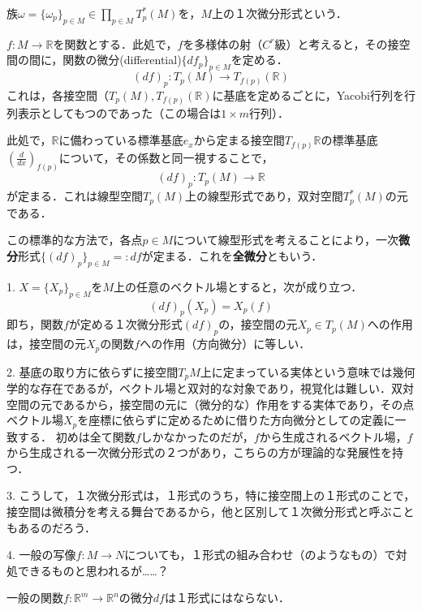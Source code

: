 \documentclass[uplatex, dvipdfmx]{jsreport}
\begin{document}
\begin{definition}
    族$\omega=\{\omega_p\}_{p\in M}\in \prod_{p\in M}T_p^*(M)$を，$M$上の１次微分形式という．
\end{definition}

\begin{example}[多様体上に定まった関数の定める１形式]
    $f:M\to\mathbb{R}$を関数とする．此処で，$f$を多様体の射（$C^r$級）と考えると，その接空間の間に，関数の微分(differential)$\{df_p\}_{p\in M}$を定める．
    \[ (df)_p:T_p(M)\to T_{f(p)}(\mathbb{R}) \]
    これは，各接空間（$T_p(M),T_{f(p)}(\mathbb{R})$に基底を定めるごとに，Yacobi行列を行列表示としてもつのであった（この場合は$1\times m$行列）．

    此処で，$\mathbb{R}$に備わっている標準基底$e_x$から定まる接空間$T_{f(p)}\mathbb{R}$の標準基底$\left(\frac{d}{dx}\right)_{f(p)}$について，その係数と同一視することで，
    \[ (df)_p:T_p(M)\to\mathbb{R} \]
    が定まる．これは線型空間$T_p(M)$上の線型形式であり，双対空間$T_p^*(M)$の元である．

    この標準的な方法で，各点$p\in M$について線型形式を考えることにより，一次\textbf{微分}形式$\{(df)_p\}_{p\in M}=:df$が定まる．これを\textbf{全微分}ともいう．

    1. $X=\{X_p\}_{p\in M}$を$M$上の任意のベクトル場とすると，次が成り立つ．
    \[ (df)_p(X_p)=X_p(f) \]
    即ち，関数$f$が定める１次微分形式$(df)_p$の，接空間の元$X_p\in T_p(M)$への作用は，接空間の元$X_p$の関数$f$への作用（方向微分）に等しい．

    2. 基底の取り方に依らずに接空間$T_pM$上に定まっている実体という意味では幾何学的な存在であるが，ベクトル場と双対的な対象であり，視覚化は難しい．双対空間の元であるから，接空間の元に（微分的な）作用をする実体であり，その点ベクトル場$X_p$を座標に依らずに定めるために借りた方向微分としての定義に一致する．
    初めは全て関数$f$しかなかったのだが，$f$から生成されるベクトル場，$f$から生成される一次微分形式の２つがあり，こちらの方が理論的な発展性を持つ．

    3. こうして，１次微分形式は，１形式のうち，特に接空間上の１形式のことで，接空間は微積分を考える舞台であるから，他と区別して１次微分形式と呼ぶこともあるのだろう．

    4. 一般の写像$f:M\to N$についても，１形式の組み合わせ（のようなもの）で対処できるものと思われるが……？
\end{example}
\begin{remark}
    一般の関数$f:\mathbb{R}^m\to\mathbb{R}^n$の微分$df$は１形式にはならない．
\end{remark}
\end{document}
